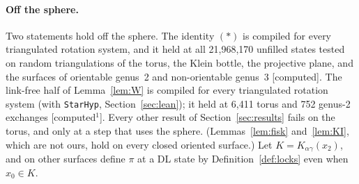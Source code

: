 \documentclass[11pt]{article}
\theoremstyle{definition}
\newcommand{\lab}[1]{\textsf{[#1]}}
\newcommand{\labone}{\textsf{[computed$^1$]}}
\newcommand{\lean}[1]{\texttt{#1}}
\begin{document}
\paragraph{Off the sphere.} Two statements hold off the sphere. The identity $(\ast)$ is compiled for every triangulated rotation system, and it held at all 21,968,170 unfilled states tested on random triangulations of the torus, the Klein bottle, the projective plane, and the surfaces of orientable genus~2 and non-orientable genus~3 \lab{computed}. The link-free half of Lemma~\ref{lem:W} is compiled for every triangulated rotation system (with \lean{StarHyp}, Section~\ref{sec:lean}); it held at 6,411 torus and 752 genus-2 exchanges \labone. Every other result of Section~\ref{sec:results} fails on the torus, and only at a step that uses the sphere. (Lemmas~\ref{lem:fisk} and~\ref{lem:KI}, which are not ours, hold on every closed oriented surface.) Let $K=K_{\alpha\gamma}(x_2)$, and on other surfaces define $\pi$ at a DL state by Definition~\ref{def:locks} even when $x_0\in K$.
\end{document}
